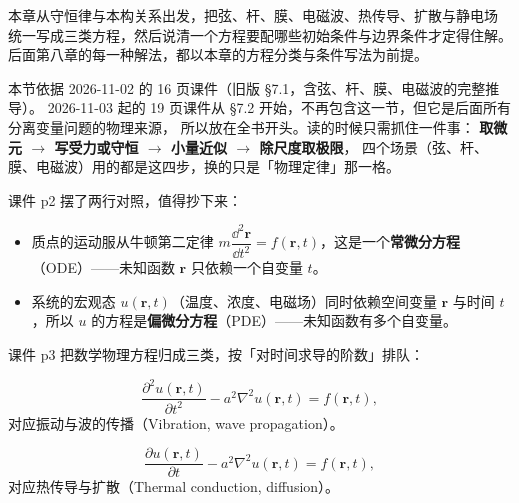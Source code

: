 \label{sec:ch7}

本章从守恒律与本构关系出发，把弦、杆、膜、电磁波、热传导、扩散与静电场
统一写成三类方程，然后说清一个方程要配哪些初始条件与边界条件才定得住解。
后面第八章的每一种解法，都以本章的方程分类与条件写法为前提。

\label{sec:71}

本节依据 2026-11-02 的 16 页课件（旧版 §7.1，含弦、杆、膜、电磁波的完整推导）。
2026-11-03 起的 19 页课件从 §7.2 开始，不再包含这一节，但它是后面所有分离变量问题的物理来源，
所以放在全书开头。读的时候只需抓住一件事：
\textbf{取微元 $\rightarrow$ 写受力或守恒 $\rightarrow$ 小量近似 $\rightarrow$ 除尺度取极限}，
四个场景（弦、杆、膜、电磁波）用的都是这四步，换的只是「物理定律」那一格。

\label{sec:711}



课件 p2 摆了两行对照，值得抄下来：

\begin{itemize}
\item 质点的运动服从牛顿第二定律 $m\dfrac{\dd^2\mathbf r}{\dd t^2}=f(\mathbf r,t)$，这是一个\textbf{常微分方程}（ODE）——未知函数 $\mathbf r$ 只依赖一个自变量 $t$。
\item 系统的宏观态 $u(\mathbf r,t)$（温度、浓度、电磁场）同时依赖空间变量 $\mathbf r$ 与时间 $t$，所以 $u$ 的方程是\textbf{偏微分方程}（PDE）——未知函数有多个自变量。
\end{itemize}



课件 p3 把数学物理方程归成三类，按「对时间求导的阶数」排队：

\[
\frac{\partial^2 u(\mathbf r,t)}{\partial t^2}-a^2\nabla^2u(\mathbf r,t)=f(\mathbf r,t),
\]
对应振动与波的传播（Vibration, wave propagation）。

\[
\frac{\partial u(\mathbf r,t)}{\partial t}-a^2\nabla^2u(\mathbf r,t)=f(\mathbf r,t),
\]
对应热传导与扩散（Thermal conduction, diffusion）。

